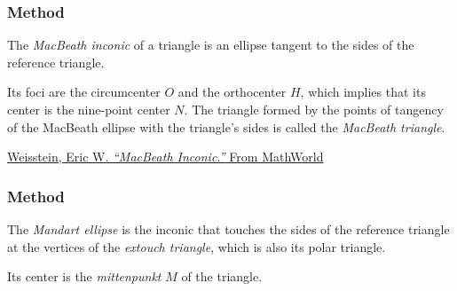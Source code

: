 \subsubsection{Method }
\label{ssub:method_triangle_macbeath__inellipse}

The \emph{MacBeath inconic} of a triangle is an ellipse tangent to the sides of the reference triangle.

\medskip

Its foci are the circumcenter $O$ and the orthocenter $H$, which implies that its center is the nine-point center $N$. The triangle formed by the points of tangency of the MacBeath ellipse with the triangle's sides is called the \emph{MacBeath triangle}.
\begin{flushright}
  \small
\href{https://mathworld.wolfram.com/MacBeathInconic.html}{Weisstein, Eric W. \emph{“MacBeath Inconic.”} From MathWorld}
\end{flushright}

\vspace{1em}

\begin{tkzexample}[latex=.5\textwidth]
\end{tkzexample}

\subsubsection{Method }
\label{ssub:method_triangle_mandart__inellipse}

The \emph{Mandart ellipse} is the inconic that touches the sides of the reference triangle at the vertices of the \emph{extouch triangle}, which is also its polar triangle.

\medskip

Its center is the \emph{mittenpunkt} $M$ of the triangle.

